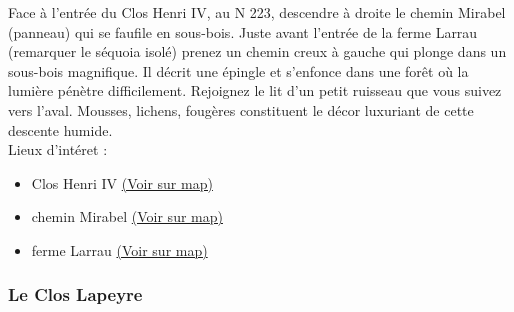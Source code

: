 \documentclass[titlepage]{article}
\begin{document}
                        Face à l'entrée du Clos Henri IV, au N 223, descendre à droite le chemin Mirabel (panneau) qui se faufile en sous-bois. Juste avant l'entrée de la ferme Larrau (remarquer le séquoia isolé) prenez un chemin creux à gauche qui plonge dans un sous-bois magnifique. Il décrit une épingle et s'enfonce dans une forêt où la lumière pénètre difficilement. Rejoignez le lit d'un petit ruisseau que vous suivez vers l'aval. Mousses, lichens, fougères constituent le décor luxuriant de cette descente humide.
                    \\
        Lieux d'intéret : 
        \begin{itemize}
        
        \item {
        Clos Henri IV 
        \href{https://www.google.com/maps/?q=43.287530, -0.391115}{(Voir sur map)}
        }
    
        \item {
        chemin
                            Mirabel 
        \href{https://www.google.com/maps/?q=43.287530, -0.391115}{(Voir sur map)}
        }
    
        \item {
        ferme Larrau 
        \href{https://www.google.com/maps/?q=43.287530, -0.391115}{(Voir sur map)}
        }
    
        \end{itemize}
    
        
        \subsubsection{Le Clos Lapeyre}
        \paragraph{}
        
\end{document}
